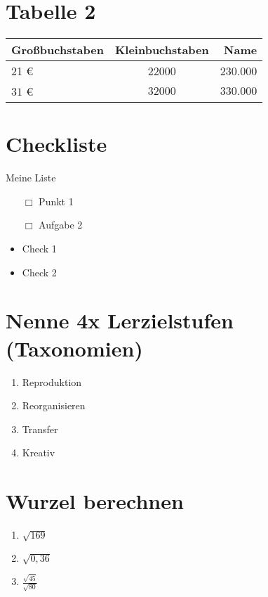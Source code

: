 \section{Tabelle 2}
    \begin{table}[!ht]%
        \begin{tabular}{@{}lcr@{}}
        \toprule 
        \textbf{Großbuchstaben} & \textbf{Kleinbuchstaben} & \textbf{Name}\\
        \midrule
        21 \euro & 22000 & 230.000 \\
        $31$ \euro & $32000$ & $330.000$ \\
        \bottomrule
        \end{tabular}
    \end{table}

\section{Checkliste}
    Meine Liste
    \begin{itemize} \itemsep -2pt  %
        \item[$\Box$]   Punkt 1
        \item[$\Box$]   Aufgabe 2 
    \end{itemize}

    \begin{itemize}[label=\checkmark] \itemsep -2pt
        \item Check 1
        \item Check 2   
    \end{itemize}

\section{\textcolor{rot5}{Nenne 4x Lerzielstufen (Taxonomien)}}
    \begin{enumerate}[label={\protect\ding{\value*}},start=192]
        \item Reproduktion
        \item Reorganisieren
        \item Transfer
        \item Kreativ
    \end{enumerate}

\section{Wurzel berechnen}
    \begin{multicols}{3}
        \begin{enumerate}[label=(\alph*)]
            \item $\sqrt{169}$
            \item $\sqrt{0,36}$
            \item $\frac{\sqrt{45}}{\sqrt{80}}$
        \end{enumerate}
    \end{multicols}

